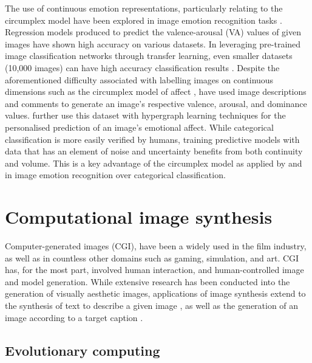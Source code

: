 \documentclass{article}
\begin{document}
The use of continuous emotion representations, particularly relating to the circumplex model have been explored in image emotion recognition tasks \citep{kim2018building, zhao2016predicting, zhao2017continuous}.
Regression models produced to predict the valence-arousal (VA) values of given images have shown high accuracy on various datasets.
In leveraging pre-trained image classification networks through transfer learning, even smaller datasets (10,000 images) can have high accuracy classification results \citep{kim2018building}.
Despite the aforementioned difficulty associated with labelling images on continuous dimensions such as the circumplex model of affect \citep{russell1980circumplex}, \citet{zhao2016predicting} have used image descriptions and comments to generate an image's respective valence, arousal, and dominance values.
\citet{zhao2016predicting} further use this dataset with hypergraph learning techniques for the personalised prediction of an image's emotional affect.
While categorical classification is more easily verified by humans, training predictive models with data that has an element of noise and uncertainty benefits from both continuity and volume.
This is a key advantage of the circumplex model as applied by \citet{kim2018building} and \citet{zhao2016predicting} in image emotion recognition over categorical classification.


\section{Computational image synthesis}

Computer-generated images (CGI), have been a widely used in the film industry, as well as in countless other domains such as gaming, simulation, and art.
CGI has, for the most part, involved human interaction, and human-controlled image and model generation.
While extensive research has been conducted into the generation of visually aesthetic images, applications of image synthesis extend to the synthesis of text to describe a given image \citep{mathews2016senticap}, as well as the generation of an image according to a target caption \citep{reed2016generative,zhang2017stackgan}.


\subsection{Evolutionary computing}
\end{document}
